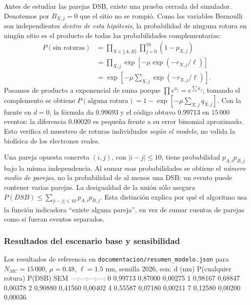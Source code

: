 \documentclass[11pt,a4paper,oneside]{article}
\begin{document}
Antes de estudiar las parejas DSB, existe una prueba cerrada del simulador. Denotemos por \(B_{X,j}=0\) que el sitio no se rompió. Como las variables Bernoulli son independientes \emph{dentro de esta hipótesis}, la probabilidad de ninguna rotura en ningún sitio es el producto de todas las probabilidades complementarias: \[\begin{aligned}
P(\text{sin roturas})&=\prod_{X\in\{A,B\}}\prod_{j=0}^{59}(1-p_{X,j})\\
&=\prod_{X,j}\exp[-\mu\exp(-r_{X,j}/\ell)]\\
&=\exp\left[-\mu\sum_{X,j}\exp(-r_{X,j}/\ell)\right].
\end{aligned}\] Pasamos de producto a exponencial de suma porque \(\prod e^{a_j}=e^{\sum a_j}\); tomando el complemento se obtiene \(P(\text{alguna rotura})=1-\exp[-\mu\sum_{X,j}q_{X,j}]\). Con la fuente en \(d=0\), la fórmula da \(0.99693\) y el código obtuvo \(0.99713\) en \(15\,000\) eventos: la diferencia \(0.00020\) es pequeña frente a su error binomial aproximado. Esto verifica el muestreo de roturas individuales \emph{según el modelo}, no valida la biofísica de los electrones reales.

Una pareja opuesta concreta \((i,j)\), con \(|i-j|\leq10\), tiene probabilidad \(p_{A,i}p_{B,j}\) bajo la misma independencia. Al sumar esas probabilidades se obtiene el \emph{número medio de parejas}, no la probabilidad de al menos una DSB: un evento puede contener varias parejas. La desigualdad de la unión sólo asegura \(P(DSB)\leq\sum_{|i-j|\leq10}p_{A,i}p_{B,j}\). Esta distinción explica por qué el algoritmo usa la función indicadora ``existe alguna pareja'', en vez de sumar cuentas de parejas como si fueran eventos separados.

\subsubsection{Resultados del escenario base y sensibilidad}\label{resultados-del-escenario-base-y-sensibilidad}

Los resultados de referencia en \texttt{documentacion/resumen\_modelo.json} para \(N_{MC}=15\,000\), \(\mu=0.48\), \(\ell=1.5\) nm, semilla 2026, son: \textbar{} d (nm) \textbar{} P(cualquier rotura) \textbar{} P(DSB) \textbar{} SEM \textbar{} \textbar---:\textbar---:\textbar---:\textbar---:\textbar{} \textbar{} 0 \textbar{} 0,99713 \textbar{} 0,87000 \textbar{} 0,00275 \textbar{} \textbar{} 1 \textbar{} 0,98167 \textbar{} 0,68847 \textbar{} 0,00378 \textbar{} \textbar{} 2 \textbar{} 0,90880 \textbar{} 0,41560 \textbar{} 0,00402 \textbar{} \textbar{} 4 \textbar{} 0,55587 \textbar{} 0,07180 \textbar{} 0,00211 \textbar{} \textbar{} 7 \textbar{} 0,12580 \textbar{} 0,00200 \textbar{} 0,00036 \textbar{}
\end{document}
